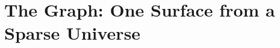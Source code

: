 %
\renewcommand{\figdir}{figures/ch11}
\chapter[The graph: one surface from a sparse universe]{The Graph: One
  Surface from a Sparse Universe}
\label{ch:graph}

